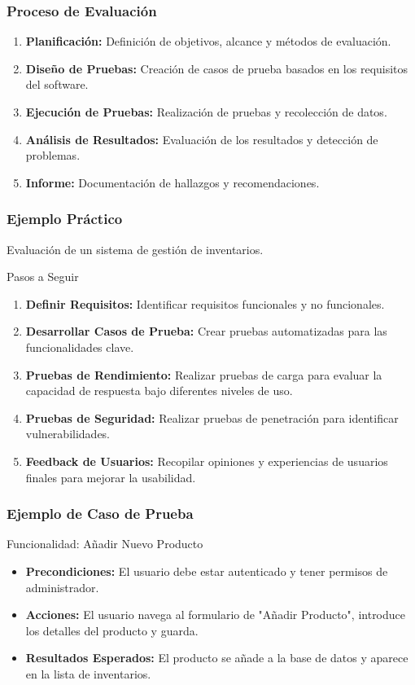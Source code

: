 \documentclass{beamer}
\begin{document}
\begin{frame}
\frametitle{Proceso de Evaluación}
\begin{enumerate}
    \item \textbf{Planificación:} Definición de objetivos, alcance y métodos de evaluación.
    \item \textbf{Diseño de Pruebas:} Creación de casos de prueba basados en los requisitos del software.
    \item \textbf{Ejecución de Pruebas:} Realización de pruebas y recolección de datos.
    \item \textbf{Análisis de Resultados:} Evaluación de los resultados y detección de problemas.
    \item \textbf{Informe:} Documentación de hallazgos y recomendaciones.
\end{enumerate}
\end{frame}

\begin{frame}
\frametitle{Ejemplo Práctico}
Evaluación de un sistema de gestión de inventarios.
\begin{block}{Pasos a Seguir}
    \begin{enumerate}
        \item \textbf{Definir Requisitos:} Identificar requisitos funcionales y no funcionales.
        \item \textbf{Desarrollar Casos de Prueba:} Crear pruebas automatizadas para las funcionalidades clave.
        \item \textbf{Pruebas de Rendimiento:} Realizar pruebas de carga para evaluar la capacidad de respuesta bajo diferentes niveles de uso.
        \item \textbf{Pruebas de Seguridad:} Realizar pruebas de penetración para identificar vulnerabilidades.
        \item \textbf{Feedback de Usuarios:} Recopilar opiniones y experiencias de usuarios finales para mejorar la usabilidad.
    \end{enumerate}
\end{block}
\end{frame}

\begin{frame}
\frametitle{Ejemplo de Caso de Prueba}
\begin{block}{Funcionalidad: Añadir Nuevo Producto}
\begin{itemize}
    \item \textbf{Precondiciones:} El usuario debe estar autenticado y tener permisos de administrador.
    \item \textbf{Acciones:} El usuario navega al formulario de "Añadir Producto", introduce los detalles del producto y guarda.
    \item \textbf{Resultados Esperados:} El producto se añade a la base de datos y aparece en la lista de inventarios.
\end{itemize}
\end{block}
\end{frame}
\end{document}

